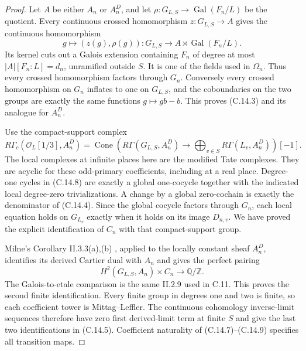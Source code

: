 \begin{proof}
Let $A$ be either $A_n$ or $A_n^D$, and let
$\rho:G_{L,S}\to\operatorname{Gal}(F_n/L)$ be the quotient.
Every continuous crossed homomorphism $z:G_{L,S}\to A$
gives the continuous homomorphism
\[
       g\longmapsto(z(g),\rho(g)):
       G_{L,S}\longrightarrow A\rtimes\operatorname{Gal}(F_n/L).
                                                               \tag{C.14.7}
\]
Its kernel cuts out a Galois extension containing $F_n$
of degree at most $|A|[F_n:L]=d_n$, unramified outside $S$.
It is one of the fields used in $\Omega_n$. Thus every
crossed homomorphism factors through $G_n$.
Conversely every crossed homomorphism on $G_n$ inflates to
one on $G_{L,S}$, and the coboundaries on the two groups
are exactly the same functions $g\mapsto gb-b$.
This proves (C.14.3) and its analogue for $A_n^D$.

Use the compact-support complex
\[
 R\Gamma_c(\mathcal O_L[1/3],A_n^D)
 =\operatorname{Cone}\!\left(
 R\Gamma(G_{L,S},A_n^D)
 \longrightarrow\bigoplus_{v\in S}R\Gamma(L_v,A_n^D)
                          \right)[-1].                       \tag{C.14.8}
\]
The local complexes at infinite places here are the modified
Tate complexes. They are acyclic for these odd-primary
coefficients, including at a real place. Degree-one cycles
in (C.14.8) are exactly a global one-cocycle together with
the indicated local degree-zero trivializations. A change
by a global zero-cochain is exactly the denominator of
(C.14.4). Since the global cocycle factors through $G_n$,
each local equation holds on $G_{L_v}$ exactly when it
holds on its image $D_{n,v}$. We have proved the explicit
identification of $C_n$ with that compact-support group.

Milne's Corollary II.3.3(a),(b) \cite{MilneADT}, applied
to the locally constant sheaf $A_n^D$, identifies its
derived Cartier dual with $A_n$ and gives the perfect
pairing
\[
 H^2(G_{L,S},A_n)\times C_n
               \longrightarrow\mathbb Q/\mathbb Z.          \tag{C.14.9}
\]
The Galois-to-etale comparison is the same II.2.9 used
in C.11. This proves the second finite identification.
Every finite group in degrees one and two is finite, so
each coefficient tower is Mittag--Leffler. The continuous
cohomology inverse-limit sequences therefore have zero
first derived-limit term at finite $S$ and give the last
two identifications in (C.14.5). Coefficient naturality
of (C.14.7)--(C.14.9) specifies all transition maps.


\end{proof}
